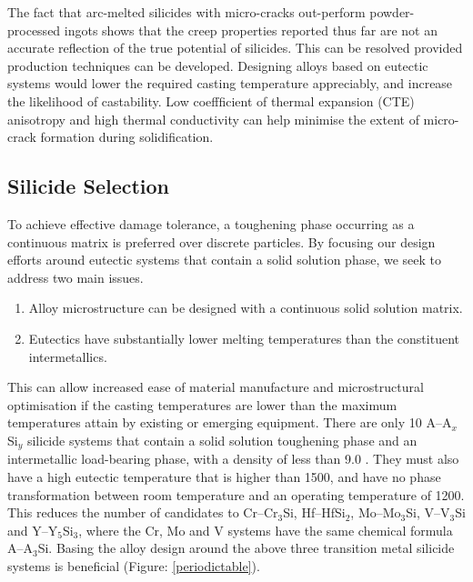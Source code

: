 The fact that arc-melted silicides with micro-cracks out-perform powder-processed ingots shows that the creep properties reported thus far are not an accurate reflection of the true potential of silicides.  This can be resolved provided production techniques can be developed. Designing alloys based on eutectic systems would lower the required casting temperature appreciably, and increase the likelihood of castability.  Low coeffficient of thermal expansion (CTE) anisotropy and high thermal conductivity can help minimise the extent of micro-crack formation during solidification.


\subsection{Silicide Selection}

To achieve effective damage tolerance, a toughening phase occurring as a continuous matrix is preferred over discrete particles.  By focusing our design efforts around eutectic systems that contain a solid solution phase, we seek to address two main issues.
\begin{enumerate}
\item Alloy microstructure can be designed with a continuous solid solution matrix.  \item Eutectics have substantially lower melting temperatures than the constituent intermetallics.
\end{enumerate}  
  This can allow increased ease of material manufacture and microstructural optimisation if the casting temperatures are lower than the maximum temperatures attain by existing or emerging equipment. There are only 10 A--A$_x$Si$_y$ silicide systems that contain a solid solution toughening phase and an intermetallic load-bearing phase, with a density of less than 9.0 \gram\usk\centi\rpcubic\metre. They must also have a high eutectic temperature that is higher than 1500\celsius, and have no phase transformation between room temperature and an operating temperature of 1200\celsius.  This reduces the number of candidates to Cr--Cr$_3$Si, Hf--HfSi$_2$, Mo--Mo$_3$Si, V--V$_3$Si and Y--Y$_5$Si$_3$, where the Cr, Mo and V systems have the same chemical formula A--A$_3$Si. Basing the alloy design around the above three transition metal silicide systems is beneficial (Figure: \ref{periodictable}). 
%
